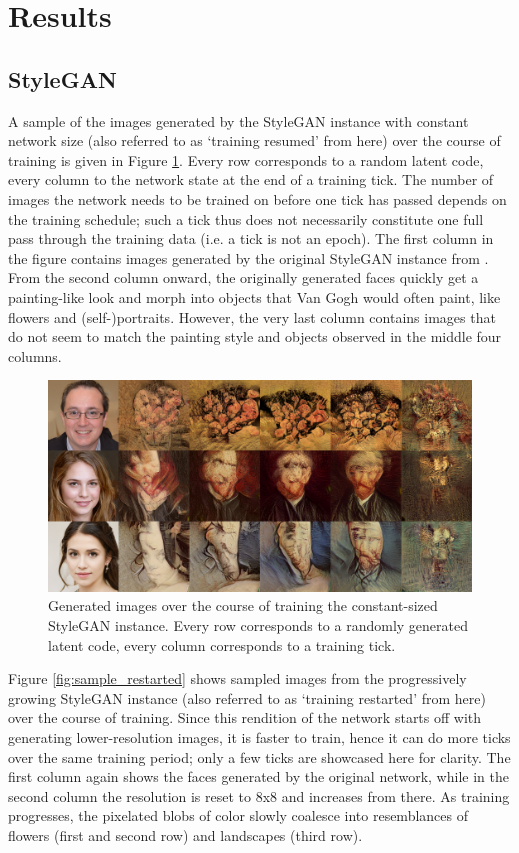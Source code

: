 \documentclass{article}
\begin{document}
\section{Results}

\subsection{StyleGAN}
A sample of the images generated by the StyleGAN instance with constant network size (also referred to as `training resumed' from here) over the course of training is given in Figure \ref{fig:sample_resumed}. Every row corresponds to a random latent code, every column to the network state at the end of a training tick. The number of images the network needs to be trained on before one tick has passed depends on the training schedule; such a tick thus does not necessarily constitute one full pass through the training data (i.e. a tick is not an epoch). The first column in the figure contains images generated by the original StyleGAN instance from \cite{karras2019stylebased}. From the second column onward, the originally generated faces quickly get a painting-like look and morph into objects that Van Gogh would often paint, like flowers and (self-)portraits. However, the very last column contains images that do not seem to match the painting style and objects observed in the middle four columns.

\begin{figure}
    \centering
    \includegraphics[width=\linewidth]{report/img/morphing.png}
    \caption{Generated images over the course of training the constant-sized StyleGAN instance. Every row corresponds to a randomly generated latent code, every column corresponds to a training tick.}
    \label{fig:sample_resumed}
\end{figure}

Figure \ref{fig:sample_restarted} shows sampled images from the progressively growing StyleGAN instance (also referred to as `training restarted' from here) over the course of training. Since this rendition of the network starts off with generating lower-resolution images, it is faster to train, hence it can do more ticks over the same training period; only a few ticks are showcased here for clarity. The first column again shows the faces generated by the original network, while in the second column the resolution is reset to 8x8 and increases from there. As training progresses, the pixelated blobs of color slowly coalesce into resemblances of flowers (first and second row) and landscapes (third row).
\end{document}
